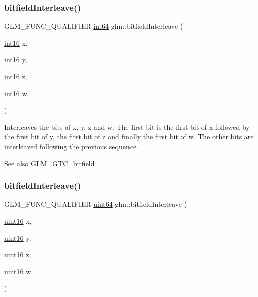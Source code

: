 \subsubsection{\texorpdfstring{bitfield\+Interleave()}{bitfieldInterleave()}\hspace{0.1cm}{\footnotesize\ttfamily [15/16]}}
{\footnotesize\ttfamily G\+L\+M\+\_\+\+F\+U\+N\+C\+\_\+\+Q\+U\+A\+L\+I\+F\+I\+ER \hyperlink{group__gtc__type__precision_ga435d75819cce297cc5fa21bd84ef89a5}{int64} glm\+::bitfield\+Interleave (\begin{DoxyParamCaption}\item[{\hyperlink{group__gtc__type__precision_ga2945a61d12771f8954994fcddf02b021}{int16}}]{x,  }\item[{\hyperlink{group__gtc__type__precision_ga2945a61d12771f8954994fcddf02b021}{int16}}]{y,  }\item[{\hyperlink{group__gtc__type__precision_ga2945a61d12771f8954994fcddf02b021}{int16}}]{z,  }\item[{\hyperlink{group__gtc__type__precision_ga2945a61d12771f8954994fcddf02b021}{int16}}]{w }\end{DoxyParamCaption})}

Interleaves the bits of x, y, z and w. The first bit is the first bit of x followed by the first bit of y, the first bit of z and finally the first bit of w. The other bits are interleaved following the previous sequence.

\begin{DoxySeeAlso}{See also}
\hyperlink{group__gtc__bitfield}{G\+L\+M\+\_\+\+G\+T\+C\+\_\+bitfield} 
\end{DoxySeeAlso}
\mbox{\label{group__gtc__bitfield_gac8a926a7bfd9b23c22a4f685193fbfe1}} 
\subsubsection{\texorpdfstring{bitfield\+Interleave()}{bitfieldInterleave()}\hspace{0.1cm}{\footnotesize\ttfamily [16/16]}}
{\footnotesize\ttfamily G\+L\+M\+\_\+\+F\+U\+N\+C\+\_\+\+Q\+U\+A\+L\+I\+F\+I\+ER \hyperlink{group__gtc__type__precision_gae3632bf9b37da66233d78930dd06378a}{uint64} glm\+::bitfield\+Interleave (\begin{DoxyParamCaption}\item[{\hyperlink{group__gtc__type__precision_gad8c2939e1fdd8e5828b31d95c52255d5}{uint16}}]{x,  }\item[{\hyperlink{group__gtc__type__precision_gad8c2939e1fdd8e5828b31d95c52255d5}{uint16}}]{y,  }\item[{\hyperlink{group__gtc__type__precision_gad8c2939e1fdd8e5828b31d95c52255d5}{uint16}}]{z,  }\item[{\hyperlink{group__gtc__type__precision_gad8c2939e1fdd8e5828b31d95c52255d5}{uint16}}]{w }\end{DoxyParamCaption})}

